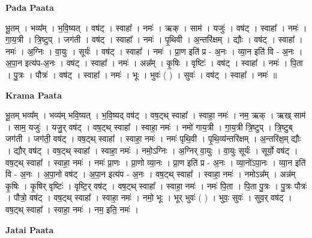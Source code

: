 \documentclass[17pt]{extarticle}
\begin{document}
\textbf{Pada Paata} \newline

भू॒तम् । भव्य᳚म् । भ॒वि॒ष्यत् । वष॑ट् । स्वाहा᳚ । नमः॑ । ऋक् । साम॑ । यजुः॑ । वष॑ट् । स्वाहा᳚ । नमः॑ । गा॒य॒त्री । त्रि॒ष्टुप् । जग॑ती । वष॑ट् । स्वाहा᳚ । नमः॑ । पृ॒थिवी । अ॒न्तरि॑क्षम् । द्यौः । वष॑ट् । स्वाहा᳚ । नमः॑ । अ॒ग्निः । वा॒युः । सूर्यः॑ । वष॑ट् । स्वाहा᳚ । नमः॑ । प्रा॒ण इति॑ प्र - अ॒नः । व्या॒न इति॑ वि - अ॒नः । अ॒पा॒न इत्य॑प-अ॒नः । वष॑ट् । स्वाहा᳚ । नमः॑ । अन्न᳚म् । कृ॒षिः । वृष्टिः॑ । वष॑ट् । स्वाहा᳚ । नमः॑ । पि॒ता । पु॒त्रः । पौत्रः॑ । वष॑ट् । स्वाहा᳚ । नमः॑ । भूः । भुवः॑ ( ) । सुवः॑ । वष॑ट् । स्वाहा᳚ । नमः॑ ॥  \newline


\textbf{Krama Paata} \newline

भू॒तम् भव्य᳚म् । भव्य॑म् भवि॒ष्यत् । भ॒वि॒ष्यद् वष॑ट् । वष॒ट्थ् स्वाहा᳚ । स्वाहा॒ नमः॑ । नम॒ ऋक् । ऋख् साम॑ । साम॒ यजुः॑ । यजु॒र् वष॑ट् । वष॒ट्थ् स्वाहा᳚ । स्वाहा॒ नमः॑ । नमो॑ गाय॒त्री । गा॒य॒त्री त्रि॒ष्टुप् । त्रि॒ष्टुब् जग॑ती । जग॑ती॒ वष॑ट् । वष॒ट्थ् स्वाहा᳚ । स्वाहा॒ नमः॑ । नमः॑ पृथि॒वी । पृ॒थि॒व्य॑न्तरि॑क्षम् । अ॒न्तरि॑क्ष॒म् द्यौः । द्यौर् वष॑ट् । वष॒ट्थ् स्वाहा᳚ । स्वाहा॒ नमः॑ । नमो॒ऽग्निः । अ॒ग्निर् वा॒युः । वा॒युः सूर्यः॑ । सूर्यो॒ वष॑ट् । वष॒ट्थ् स्वाहा᳚ । स्वाहा॒ नमः॑ । नमः॑ प्रा॒णः । प्रा॒णो व्या॒नः । प्रा॒ण इति॑ प्र - अ॒नः । व्या॒नो॑ऽपा॒नः । व्या॒न इति॑ वि - अ॒नः । अ॒पा॒नो वष॑ट् । अ॒पा॒न इत्य॑प - अ॒नः । वष॒ट्थ् स्वाहा᳚ । स्वाहा॒ नमः॑ । नमोऽन्न᳚म् । अन्न॑म् कृ॒षिः । कृ॒षिर् वृष्टिः॑ । वृष्टि॒र् वष॑ट् । वष॒ट्थ् स्वाहा᳚ । स्वाहा॒ नमः॑ । नमः॑ पि॒ता । पि॒ता पु॒त्रः । पु॒त्रः पौत्रः॑ । पौत्रो॒ वष॑ट् । वष॒ट्थ् स्वाहा᳚ । स्वाहा॒ नमः॑ । नमो॒ भूः । भूर् भुवः॑ ( ) । भुवः॒ सुवः॑ । सुव॒र् वष॑ट् । वष॒ट्थ् स्वाहा᳚ । स्वाहा॒ नमः॑ । नम॒ इति॒ नमः॑ । \newline

\textbf{Jatai Paata} \newline
\end{document}
